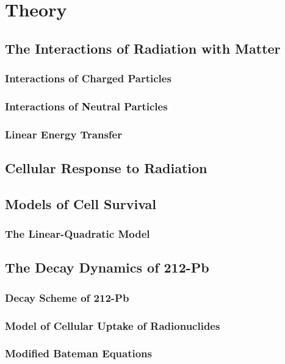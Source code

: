\chapter{Theory}

\section{The Interactions of Radiation with Matter}


\subsection{Interactions of Charged Particles}


\subsection{Interactions of Neutral Particles}

\subsection{Linear Energy Transfer}

\section{Cellular Response to Radiation}

\section{Models of Cell Survival}

\subsection{The Linear-Quadratic Model}

\section{The Decay Dynamics of 212-Pb}

\subsection{Decay Scheme of 212-Pb}

\subsection{Model of Cellular Uptake of Radionuclides}

\subsection{Modified Bateman Equations}


